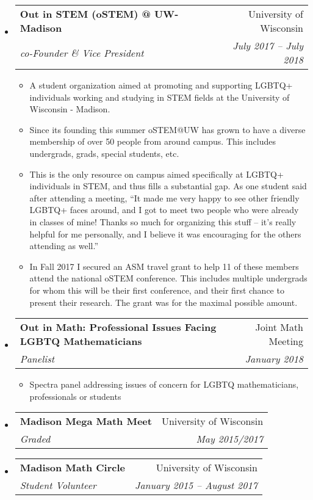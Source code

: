 \documentclass[letterpaper,11pt]{article}
\makeatletter
\newcommand{\ressubheading}[4]{
\begin{tabular*}{6.5in}[t]{l@{\cftdotfill{\cftsecdotsep}\extracolsep{\fill}}r}
		\textbf{#1} & #2 \\
		\textit{#3} & \textit{#4} \\
\end{tabular*}\vspace{-6pt}}
\makeatother
\begin{document}
\begin{itemize}
\item 
	\ressubheading{Out in STEM (oSTEM) @ UW-Madison}{University of Wisconsin}{co-Founder \& Vice President}{July 2017 -- July 2018}
	\begin{itemize}
		\item A student organization aimed at promoting and supporting LGBTQ+ individuals working and studying in STEM fields at the University of Wisconsin - Madison.
		\item Since its founding this summer oSTEM@UW has grown to have a diverse membership of over 50 people from around campus. This includes undergrads, grads, special students, etc. 
		\item This is the only resource on campus aimed specifically at LGBTQ+ individuals in STEM, and thus fills a substantial gap. As one student said after attending a meeting, ``It made me very happy to see other friendly LGBTQ+ faces around, and I got to meet two people who were already in classes of mine! Thanks so much for organizing this stuff -- it's really helpful for me personally, and I believe it was encouraging for the others attending as well.''
		\item In Fall 2017 I secured an ASM travel grant to help 11 of these members attend the national oSTEM conference. This includes multiple undergrads for whom this will be their first conference, and their first chance to present their research. The grant was for the maximal possible amount.
	\end{itemize}

\item 
	\ressubheading{Out in Math: Professional Issues Facing LGBTQ Mathematicians}{Joint Math Meeting}{Panelist}{January 2018}
	\begin{itemize}
		\item Spectra panel addressing issues of concern for LGBTQ mathematicians, professionals or students
		\end{itemize}
			
\item 
	\ressubheading{Madison Mega Math Meet}{University of Wisconsin}{Graded}{May 2015/2017}

\item 
	\ressubheading{Madison Math Circle}{University of Wisconsin}{Student Volunteer}{January 2015 -- August 2017}
	

\end{itemize}
\end{document}
